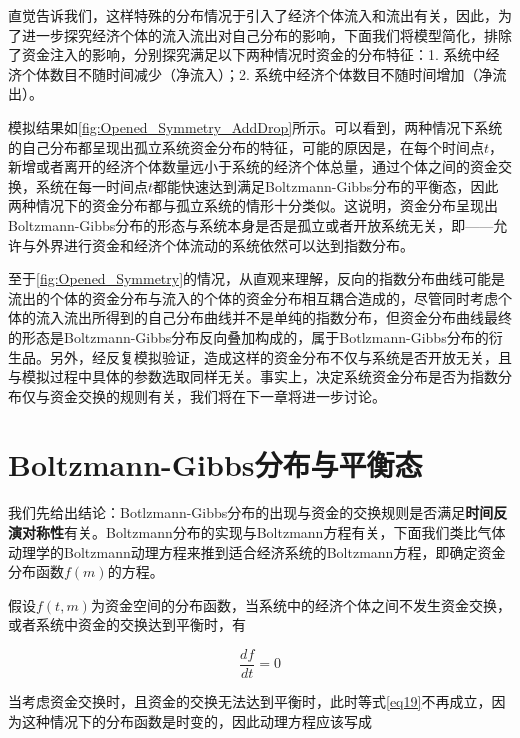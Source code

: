 \documentclass[tsinghuacite]{HustGraduPaper}
\begin{document}
			直觉告诉我们，这样特殊的分布情况于引入了经济个体流入和流出有关，因此，为了进一步探究经济个体的流入流出对自己分布的影响，下面我们将模型简化，排除了资金注入的影响，分别探究满足以下两种情况时资金的分布特征：1. 系统中经济个体数目不随时间减少（净流入）；2. 系统中经济个体数目不随时间增加（净流出）。

			模拟结果如\autoref{fig:Opened_Symmetry_AddDrop}所示。可以看到，两种情况下系统的自己分布都呈现出孤立系统资金分布的特征，可能的原因是，在每个时间点$t$，新增或者离开的经济个体数量远小于系统的经济个体总量，通过个体之间的资金交换，系统在每一时间点$t$都能快速达到满足Boltzmann-Gibbs分布的平衡态，因此两种情况下的资金分布都与孤立系统的情形十分类似。这说明，资金分布呈现出Boltzmann-Gibbs分布的形态与系统本身是否是孤立或者开放系统无关，即——允许与外界进行资金和经济个体流动的系统依然可以达到指数分布。
			
			至于\autoref{fig:Opened_Symmetry}的情况，从直观来理解，反向的指数分布曲线可能是流出的个体的资金分布与流入的个体的资金分布相互耦合造成的，尽管同时考虑个体的流入流出所得到的自己分布曲线并不是单纯的指数分布，但资金分布曲线最终的形态是Boltzmann-Gibbs分布反向叠加构成的，属于Botlzmann-Gibbs分布的衍生品。另外，经反复模拟验证，造成这样的资金分布不仅与系统是否开放无关，且与模拟过程中具体的参数选取同样无关。事实上，决定系统资金分布是否为指数分布仅与资金交换的规则有关，我们将在下一章将进一步讨论。
			
	
	
	
	
	\newpage
	
	\section{Boltzmann-Gibbs分布与平衡态}\label{sec:time_symmetry}
	
	
		我们先给出结论：Botlzmann-Gibbs分布的出现与资金的交换规则是否满足{\bfseries 时间反演对称性}有关。Boltzmann分布的实现与Boltzmann方程有关，下面我们类比气体动理学的Boltzmann动理方程来推到适合经济系统的Boltzmann方程，即确定资金分布函数$f(m)$的方程\cite{pitaevskii2012physical}。
	
		假设$f(t,m)$为资金空间的分布函数，当系统中的经济个体之间不发生资金交换，或者系统中资金的交换达到平衡时，有
		
		\begin{equation}
			\frac{df}{dt} = 0 \label{eq19}
		\end{equation}
		
		\vspace{1.5em}  
		
		当考虑资金交换时，且资金的交换无法达到平衡时，此时等式\eqref{eq19}不再成立，因为这种情况下的分布函数是时变的，因此动理方程应该写成
		
\end{document}
